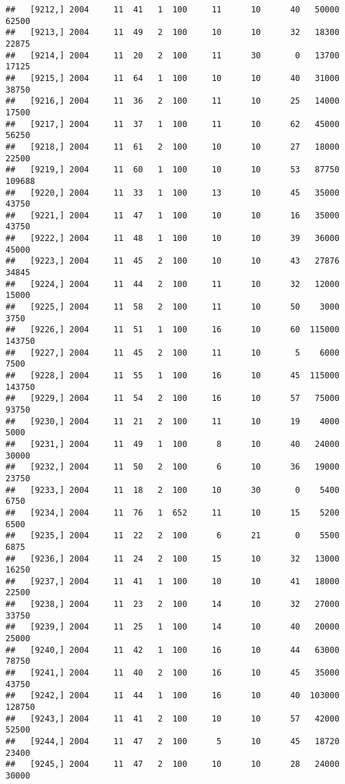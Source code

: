 \documentclass{article}\usepackage[]{graphicx}\usepackage[]{color}
\makeatletter
\newenvironment{kframe}{%
 \def\at@end@of@kframe{}%
 \ifinner\ifhmode%
  \def\at@end@of@kframe{\end{minipage}}%
  \begin{minipage}{\columnwidth}%
 \fi\fi%
 \def\FrameCommand##1{\hskip\@totalleftmargin \hskip-\fboxsep
 \colorbox{shadecolor}{##1}\hskip-\fboxsep
     \hskip-\linewidth \hskip-\@totalleftmargin \hskip\columnwidth}%
 \MakeFramed {\advance\hsize-\width
   \@totalleftmargin\z@ \linewidth\hsize
   \@setminipage}}%
 {\par\unskip\endMakeFramed%
 \at@end@of@kframe}
\newenvironment{knitrout}{}{} %
\makeatother
\begin{document}
\begin{knitrout}
\begin{kframe}
\begin{verbatim}
##   [9212,] 2004     11  41   1  100     11      10      40   50000   62500
##   [9213,] 2004     11  49   2  100     10      10      32   18300   22875
##   [9214,] 2004     11  20   2  100     11      30       0   13700   17125
##   [9215,] 2004     11  64   1  100     10      10      40   31000   38750
##   [9216,] 2004     11  36   2  100     11      10      25   14000   17500
##   [9217,] 2004     11  37   1  100     11      10      62   45000   56250
##   [9218,] 2004     11  61   2  100     10      10      27   18000   22500
##   [9219,] 2004     11  60   1  100     10      10      53   87750  109688
##   [9220,] 2004     11  33   1  100     13      10      45   35000   43750
##   [9221,] 2004     11  47   1  100     10      10      16   35000   43750
##   [9222,] 2004     11  48   1  100     10      10      39   36000   45000
##   [9223,] 2004     11  45   2  100     10      10      43   27876   34845
##   [9224,] 2004     11  44   2  100     11      10      32   12000   15000
##   [9225,] 2004     11  58   2  100     11      10      50    3000    3750
##   [9226,] 2004     11  51   1  100     16      10      60  115000  143750
##   [9227,] 2004     11  45   2  100     11      10       5    6000    7500
##   [9228,] 2004     11  55   1  100     16      10      45  115000  143750
##   [9229,] 2004     11  54   2  100     16      10      57   75000   93750
##   [9230,] 2004     11  21   2  100     11      10      19    4000    5000
##   [9231,] 2004     11  49   1  100      8      10      40   24000   30000
##   [9232,] 2004     11  50   2  100      6      10      36   19000   23750
##   [9233,] 2004     11  18   2  100     10      30       0    5400    6750
##   [9234,] 2004     11  76   1  652     11      10      15    5200    6500
##   [9235,] 2004     11  22   2  100      6      21       0    5500    6875
##   [9236,] 2004     11  24   2  100     15      10      32   13000   16250
##   [9237,] 2004     11  41   1  100     10      10      41   18000   22500
##   [9238,] 2004     11  23   2  100     14      10      32   27000   33750
##   [9239,] 2004     11  25   1  100     14      10      40   20000   25000
##   [9240,] 2004     11  42   1  100     16      10      44   63000   78750
##   [9241,] 2004     11  40   2  100     16      10      45   35000   43750
##   [9242,] 2004     11  44   1  100     16      10      40  103000  128750
##   [9243,] 2004     11  41   2  100     10      10      57   42000   52500
##   [9244,] 2004     11  47   2  100      5      10      45   18720   23400
##   [9245,] 2004     11  47   2  100     10      10      28   24000   30000

\end{verbatim}
\end{kframe}
\end{knitrout}
\end{document}
